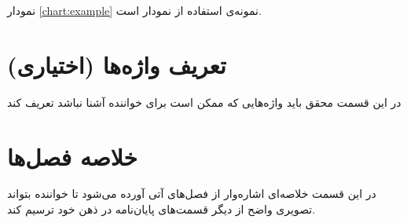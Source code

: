 نمودار \ref{chart:example} نمونه‌ی استفاده از نمودار است.


\section{تعريف واژه‌ها (اختیاری)}
در این قسمت محقق باید واژه‌هایی که ممکن است برای خواننده آشنا نباشد تعریف کند


\section{خلاصه فصل‌ها}
در این قسمت خلاصه‌ای اشاره‌وار از فصل‌های آتی آورده می‌شود تا خواننده بتواند تصویری واضح از
دیگر قسمت‌های پایان‌نامه در ذهن خود ترسیم کند.
